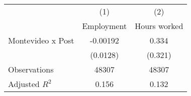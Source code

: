 {
\def\sym#1{\ifmmode^{#1}\else\(^{#1}\)\fi}
\begin{tabular}{l*{2}{c}}
\hline\hline
                &\multicolumn{1}{c}{(1)}&\multicolumn{1}{c}{(2)}\\
                &\multicolumn{1}{c}{Employment}&\multicolumn{1}{c}{Hours worked}\\
\hline
Montevideo x Post& -0.00192         &    0.334         \\
                & (0.0128)         &  (0.321)         \\
\hline
Observations    &    48307         &    48307         \\
Adjusted \(R^{2}\)&    0.156         &    0.132         \\
\hline\hline
\end{tabular}
}
